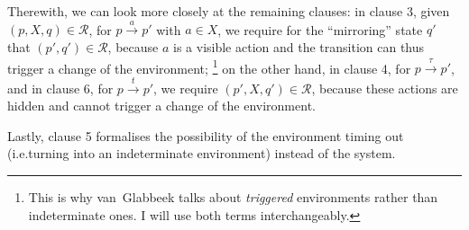 \begin{isabellebody}
\begin{isamarkuptext}
Therewith, we can look more closely at the remaining clauses:
in clause 3, given $(p,X,q) \in \mathcal{R}$, for $p \xrightarrow{a} p'$ with $a \in X$, we require for the \enquote{mirroring} state $q'$ that $(p',q') \in \mathcal{R}$, because $a$ is a visible action and the transition can thus trigger a change of the environment;%
\footnote{This is why van~Glabbeek talks about \emph{triggered} environments rather than indeterminate ones. I will use both terms interchangeably.}
on the other hand, in clause 4, for $p \xrightarrow{\tau} p'$, and in clause 6, for $p \xrightarrow{t} p'$, we require $(p',X,q') \in \mathcal{R}$, because these actions are hidden and cannot trigger a change of the environment.

Lastly, clause 5 formalises the possibility of the environment timing out (i.e.\@ turning into an indeterminate environment) instead of the system.


\end{isamarkuptext}
\end{isabellebody}
